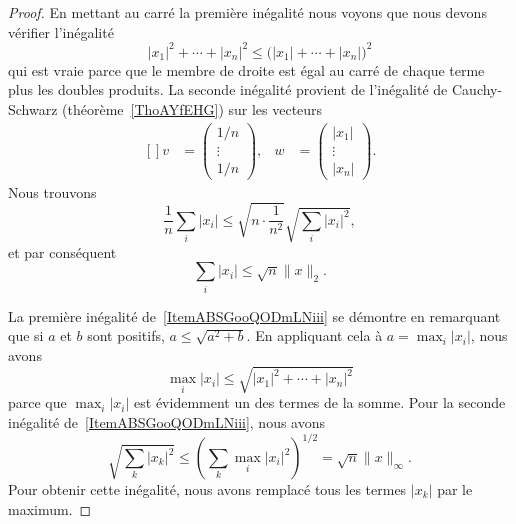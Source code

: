 \begin{proof}
	En mettant au carré la première inégalité nous voyons que nous devons vérifier l'inégalité
	\begin{equation}
		| x_1 |^2+\cdots+| x_n |^2\leq\big( | x_1 |+\cdots+| x_n | \big)^2
	\end{equation}
	qui est vraie parce que le membre de droite est égal au carré de chaque terme plus les doubles produits. La seconde inégalité provient de l'inégalité de Cauchy-Schwarz (théorème~\ref{ThoAYfEHG}) sur les vecteurs
	\begin{equation}
		\begin{aligned}[]
			v & =\begin{pmatrix}
				     1/n    \\
				     \vdots \\
				     1/n
			     \end{pmatrix},
			  & w                & =\begin{pmatrix}
				                        | x_1 | \\
				                        \vdots  \\
				                        | x_n |
			                        \end{pmatrix}.
		\end{aligned}
	\end{equation}
	Nous trouvons
	\begin{equation}
		\frac{1}{ n }\sum_i| x_i |\leq\sqrt{n\cdot\frac{1}{ n^2 }}\sqrt{\sum_i| x_i |^2},
	\end{equation}
	et par conséquent
	\begin{equation}
		\sum_i| x_i |\leq\sqrt{n}\| x \|_2.
	\end{equation}

	La première inégalité de~\ref{ItemABSGooQODmLNiii} se démontre en remarquant que si \( a\) et \( b\) sont positifs, \( a\leq\sqrt{a^2+b}\). En appliquant cela à \( a=\max_i| x_i |\), nous avons
	\begin{equation}
		\max_i| x_i |\leq\sqrt{ | x_1 |^2+\cdots+| x_n |^2  }
	\end{equation}
	parce que \( \max_i| x_i |\) est évidemment un des termes de la somme. Pour la seconde inégalité de~\ref{ItemABSGooQODmLNiii}, nous avons
	\begin{equation}
		\sqrt{\sum_k| x_k |^2}\leq\left( \sum_k\max_i| x_i |^2 \right)^{1/2}=\sqrt{n}\| x \|_{\infty}.
	\end{equation}
	Pour obtenir cette inégalité, nous avons remplacé tous les termes \( | x_k |\) par le maximum.
\end{proof}

